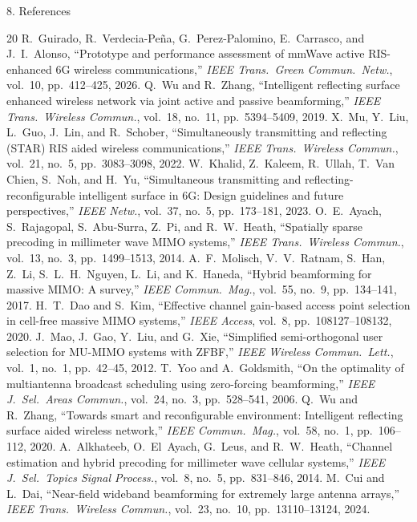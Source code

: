 \documentclass[aspectratio=169,11pt]{beamer}
\begin{document}
\begin{frame}[t]{8. References}
\vspace{-0.8em}

\fontsize{6.0pt}{6.2pt}\selectfont
\begin{thebibliography}{20}
\setlength{\parsep}{0pt}
\setlength{\parskip}{0pt}
R.~Guirado, R.~Verdecia-Pe\~{n}a, G.~Perez-Palomino, E.~Carrasco, and J.~I.~Alonso,
``Prototype and performance assessment of mmWave active RIS-enhanced 6G wireless communications,''
\textit{IEEE Trans.\ Green Commun.\ Netw.}, vol.~10, pp.~412--425, 2026.
Q.~Wu and R.~Zhang,
``Intelligent reflecting surface enhanced wireless network via joint active and passive beamforming,''
\textit{IEEE Trans.\ Wireless Commun.}, vol.~18, no.~11, pp.~5394--5409, 2019.
X.~Mu, Y.~Liu, L.~Guo, J.~Lin, and R.~Schober,
``Simultaneously transmitting and reflecting (STAR) RIS aided wireless communications,''
\textit{IEEE Trans.\ Wireless Commun.}, vol.~21, no.~5, pp.~3083--3098, 2022.
W.~Khalid, Z.~Kaleem, R.~Ullah, T.~Van Chien, S.~Noh, and H.~Yu,
``Simultaneous transmitting and reflecting-reconfigurable intelligent surface in 6G: Design guidelines and future perspectives,''
\textit{IEEE Netw.}, vol.~37, no.~5, pp.~173--181, 2023.
O.~E.~Ayach, S.~Rajagopal, S.~Abu-Surra, Z.~Pi, and R.~W.~Heath,
``Spatially sparse precoding in millimeter wave MIMO systems,''
\textit{IEEE Trans.\ Wireless Commun.}, vol.~13, no.~3, pp.~1499--1513, 2014.
A.~F.~Molisch, V.~V.~Ratnam, S.~Han, Z.~Li, S.~L.~H.~Nguyen, L.~Li, and K.~Haneda,
``Hybrid beamforming for massive MIMO: A survey,''
\textit{IEEE Commun.\ Mag.}, vol.~55, no.~9, pp.~134--141, 2017.
H.~T.~Dao and S.~Kim,
``Effective channel gain-based access point selection in cell-free massive MIMO systems,''
\textit{IEEE Access}, vol.~8, pp.~108127--108132, 2020.
J.~Mao, J.~Gao, Y.~Liu, and G.~Xie,
``Simplified semi-orthogonal user selection for MU-MIMO systems with ZFBF,''
\textit{IEEE Wireless Commun.\ Lett.}, vol.~1, no.~1, pp.~42--45, 2012.
T.~Yoo and A.~Goldsmith,
``On the optimality of multiantenna broadcast scheduling using zero-forcing beamforming,''
\textit{IEEE J.\ Sel.\ Areas Commun.}, vol.~24, no.~3, pp.~528--541, 2006.
Q.~Wu and R.~Zhang,
``Towards smart and reconfigurable environment: Intelligent reflecting surface aided wireless network,''
\textit{IEEE Commun.\ Mag.}, vol.~58, no.~1, pp.~106--112, 2020.
A.~Alkhateeb, O.~El~Ayach, G.~Leus, and R.~W.~Heath,
``Channel estimation and hybrid precoding for millimeter wave cellular systems,''
\textit{IEEE J.\ Sel.\ Topics Signal Process.}, vol.~8, no.~5, pp.~831--846, 2014.
M.~Cui and L.~Dai,
``Near-field wideband beamforming for extremely large antenna arrays,''
\textit{IEEE Trans.\ Wireless Commun.}, vol.~23, no.~10, pp.~13110--13124, 2024.
\end{thebibliography}
\end{frame}
\end{document}
